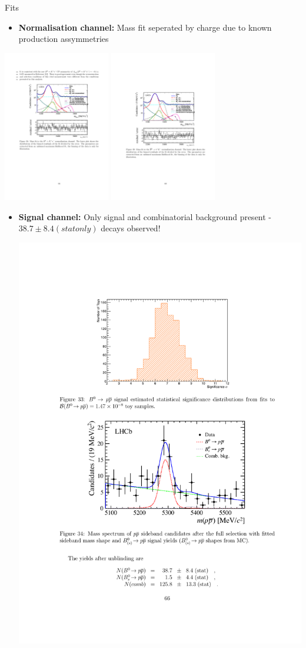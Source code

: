 \documentclass{beamer}
\begin{document}
\begin{frame}{Fits}
  \begin{itemize}
  \item \textbf{Normalisation channel:} Mass fit seperated by charge due to known production assymmetries
  \end{itemize}
  \begin{center}
    \includegraphics[width=0.35\textwidth]{PPNormMassFit.pdf}
    \includegraphics[width=0.35\textwidth]{PPNormMassFitBar.pdf}
  \end{center}
  \begin{itemize}
  \item \textbf{Signal channel:} Only signal and combinatorial background present - $38.7\pm8.4(stat only)$ \decay{\Bd}{\proton\antiproton} decays observed!
    \begin{center}
      \includegraphics[width=.4\textwidth]{PPSignalMassFit.pdf}
    \end{center}
  \end{itemize}
\end{frame}
\end{document}
